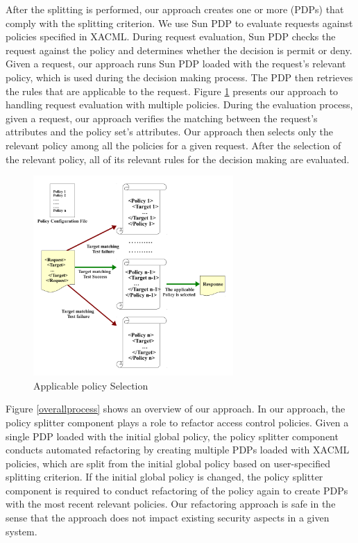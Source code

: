 After the splitting is performed, our approach creates one or more (PDPs) that comply with the splitting criterion.
We use Sun PDP \cite{sunxacml} to evaluate requests against policies specified in XACML.
During request evaluation, Sun PDP checks the request against the policy and determines whether the
decision is permit or deny. Given a request, our approach runs Sun PDP loaded with the request's relevant policy,
 which is used during the decision making process. The PDP then retrieves the rules that are applicable to the request.
Figure \ref{requestevaluation} presents our approach to handling request evaluation with multiple policies. 
During the evaluation process, given a request, our approach verifies the matching between the request's attributes
and the policy set's attributes. Our approach then selects only the relevant policy among all the policies for a given request.
After the selection of the relevant policy, all of its relevant rules for the decision making are evaluated.

\begin{figure}[!h]
\begin{center}
\includegraphics[width=3in, height=3in]{requestevaluation}
\caption{Applicable policy Selection}
\label{requestevaluation}
\end{center}
\end{figure}


Figure \ref{overallprocess} shows an overview of our approach.
In our approach, the policy splitter component plays a role to refactor access control policies.
Given a single PDP loaded with the initial global policy, the policy splitter component conducts automated refactoring 
by creating multiple PDPs loaded with XACML policies, which are split from the initial global policy based on 
user-specified splitting criterion. 
If the initial global policy is changed, the policy splitter component is required to conduct refactoring of the policy again 
to create PDPs with the most recent relevant policies.
Our refactoring approach is safe in the sense that the approach does not impact existing security aspects in a given
system. 

